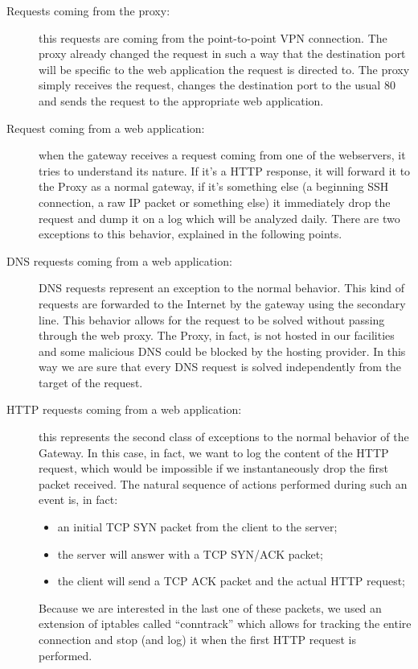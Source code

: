\begin{description}
\item[Requests coming from the proxy: ] this requests are coming from the point-to-point VPN connection. The proxy already changed the request in such a way that the destination port will be specific to the web application the request is directed to. The proxy simply receives the request, changes the destination port to the usual 80 and sends the request to the appropriate web application.

\item[Request coming from a web application: ] when the gateway receives a request coming from one of the webservers, it tries to understand its nature. If it's a HTTP response, it will forward it to the Proxy as a normal gateway, if it's something else (a beginning SSH connection, a raw IP packet or something else) it immediately drop the request and dump it on a log which will be analyzed daily. There are two exceptions to this behavior, explained in the following points.

\item[DNS requests coming from a web application: ] DNS requests represent an exception to the normal behavior. This kind of requests are forwarded to the Internet by the gateway using the secondary line. This behavior allows for the request to be solved without passing through the web proxy. The Proxy, in fact, is not hosted in our facilities and some malicious DNS could be blocked by the hosting provider. In this way we are sure that every DNS request is solved independently from the target of the request.

\item[HTTP requests coming from a web application: ] this represents the second class of exceptions to the normal behavior of the Gateway. In this case, in fact, we want to log the content of the HTTP request, which would be impossible if we instantaneously drop the first packet received. The natural sequence of actions performed during such an event is, in fact:
\begin{itemize}
\item an initial TCP SYN packet from the client to the server;
\item the server will answer with a TCP SYN/ACK packet;
\item the client will send a TCP ACK packet and the actual HTTP request;
\end{itemize}
Because we are interested in the last one of these packets, we used an extension of iptables called ``conntrack'' \cite{conntrack} which allows for tracking the entire connection and stop (and log) it when the first HTTP request is performed.
\end{description}

